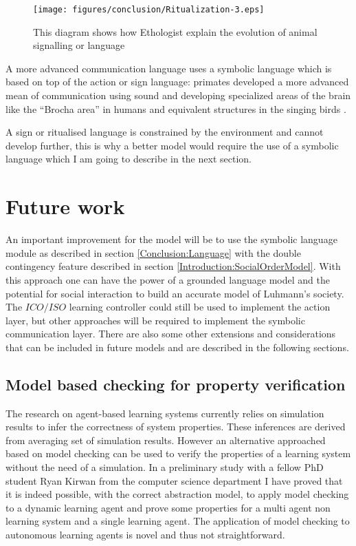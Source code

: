 \begin{figure}[htbp]
\begin{center}
\texttt{[image: figures/conclusion/Ritualization-3.eps]}
\end{center}
\vspace*{4pt}
\caption[Ritualization model]{This diagram shows how Ethologist explain
the evolution of animal signalling or language 
\label{fig:conclusion:ritualizationmodel}}
\end{figure}

A more advanced communication language uses a symbolic language which is based
on top of the action or sign language:
primates developed a more advanced mean of communication using sound and developing
 specialized areas of the brain like the ``Brocha area'' in humans and equivalent
structures in the singing birds \citep{FoxP2Gene:Nature:2001,FOXP2Identification:2005}.

A sign or ritualised language is constrained by the environment and cannot develop further, 
this is why a better model would require the use of a symbolic language which I am
going to describe in the next section.



\section{Future work \label{Conclusion:FutureWork}}

An important improvement for the model will be to use the symbolic language
module as described in section \ref{Conclusion:Language} with the double contingency
feature described in section \ref{Introduction:SocialOrderModel}.
With this approach one can have the power of a grounded language model and the
potential for social interaction to build an accurate model of Luhmann's society.
The $ICO/ISO$ learning controller could still be used to implement the action layer,
but other approaches will be required to implement the symbolic communication layer.
There are also some other extensions and considerations that can be included in future
models and are described in the following sections.


\subsection{Model based checking for property verification \label{Conclusion:ModelCheck}}


The research on agent-based learning systems
currently relies on simulation results to infer the correctness of system properties.
These inferences are derived from averaging set of simulation results. 
However an alternative approached based on model checking can be used
to verify the properties of a learning system without the need of a simulation.
In a preliminary study with a fellow PhD student Ryan Kirwan from the computer
science department I have proved that it is indeed possible, with the correct
 abstraction model, to apply model checking to a dynamic learning agent and 
 prove some properties for a multi agent non learning system and a single
 learning agent.
The application of model checking to autonomous learning agents is novel
  and thus not straightforward.
  

